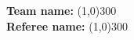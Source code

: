 \begin{flushleft}
\textbf{Team name:} \line(1,0){300} \\ 
\vspace{0.4cm}
\textbf{Referee name:} \line(1,0){300}
\end{flushleft}
